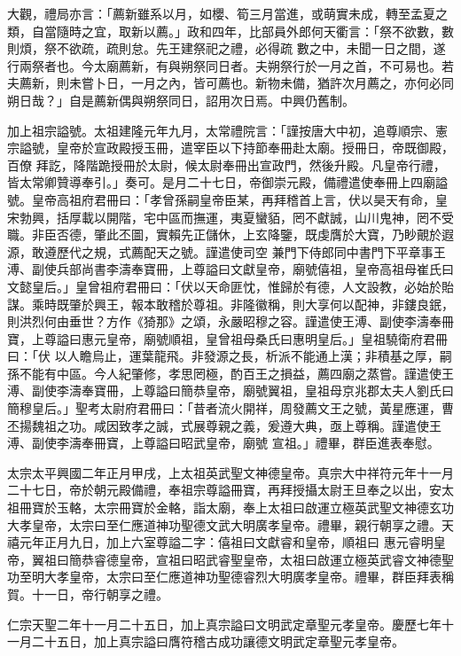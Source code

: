 \begin{pinyinscope}
 大觀，禮局亦言：「薦新雖系以月，如櫻、筍三月當進，或萌實未成，轉至孟夏之類，自當隨時之宜，取新以薦。」政和四年，比部員外郎何天衢言：「祭不欲數，數則煩，祭不欲疏，疏則怠。先王建祭祀之禮，必得疏
 數之中，未聞一日之間，遂行兩祭者也。今太廟薦新，有與朔祭同日者。夫朔祭行於一月之首，不可易也。若夫薦新，則未嘗卜日，一月之內，皆可薦也。新物未備，猶許次月薦之，亦何必同朔日哉？」自是薦新偶與朔祭同日，詔用次日焉。中興仍舊制。



 加上祖宗謚號。太祖建隆元年九月，太常禮院言：「謹按唐大中初，追尊順宗、憲宗謚號，皇帝於宣政殿授玉冊，遣宰臣以下持節奉冊赴太廟。授冊日，帝既御殿，百僚
 拜訖，降階跪授冊於太尉，候太尉奉冊出宣政門，然後升殿。凡皇帝行禮，皆太常卿贊導奉引。」奏可。是月二十七日，帝御崇元殿，備禮遣使奉冊上四廟謚號。皇帝高祖府君冊曰：「孝曾孫嗣皇帝臣某，再拜稽首上言，伏以昊天有命，皇宋勃興，括厚載以開階，宅中區而撫運，夷夏蠻貊，罔不獻誠，山川鬼神，罔不受職。非臣否德，肇此丕圖，實賴先正儲休，上玄降鑒，既虔膺於大寶，乃眇覿於遐源，敢遵歷代之規，式薦配天之號。謹遣使司空
 兼門下侍郎同中書門下平章事王溥、副使兵部尚書李濤奉寶冊，上尊謚曰文獻皇帝，廟號僖祖，皇帝高祖母崔氏曰文懿皇后。」皇曾祖府君冊曰：「伏以天命匪忱，惟歸於有德，人文設教，必始於貽謀。乘時既肇於興王，報本敢稽於尊祖。非隆徽稱，則大享何以配神，非鏤良鈱，則洪烈何由垂世？方作《猗那》之頌，永嚴昭穆之容。謹遣使王溥、副使李濤奉冊寶，上尊謚曰惠元皇帝，廟號順祖，皇曾祖母桑氏曰惠明皇后。」皇祖驍衛府君冊曰：「伏
 以人瞻烏止，運葉龍飛。非發源之長，析派不能通上漢；非積基之厚，嗣孫不能有中區。今人紀肇修，孝思罔極，酌百王之損益，薦四廟之蒸嘗。謹遣使王溥、副使李濤奉寶冊，上尊謚曰簡恭皇帝，廟號翼祖，皇祖母京兆郡太夫人劉氏曰簡穆皇后。」聖考太尉府君冊曰：「昔者流火開祥，周發薦文王之號，黃星應運，曹丕揚魏祖之功。咸因致孝之誠，式展尊親之義，爰遵大典，亟上尊稱。謹遣使王溥、副使李濤奉冊寶，上尊謚曰昭武皇帝，廟號
 宣祖。」禮畢，群臣進表奉慰。



 太宗太平興國二年正月甲戌，上太祖英武聖文神德皇帝。真宗大中祥符元年十一月二十七日，帝於朝元殿備禮，奉祖宗尊謚冊寶，再拜授攝太尉王旦奉之以出，安太祖冊寶於玉輅，太宗冊寶於金輅，詣太廟，奉上太祖曰啟運立極英武聖文神德玄功大孝皇帝，太宗曰至仁應道神功聖德文武大明廣孝皇帝。禮畢，親行朝享之禮。天禧元年正月九日，加上六室尊謚二字：僖祖曰文獻睿和皇帝，順祖曰
 惠元睿明皇帝，翼祖曰簡恭睿德皇帝，宣祖曰昭武睿聖皇帝，太祖曰啟運立極英武睿文神德聖功至明大孝皇帝，太宗曰至仁應道神功聖德睿烈大明廣孝皇帝。禮畢，群臣拜表稱賀。十一日，帝行朝享之禮。



 仁宗天聖二年十一月二十五日，加上真宗謚曰文明武定章聖元孝皇帝。慶歷七年十一月二十五日，加上真宗謚曰膺符稽古成功讓德文明武定章聖元孝皇帝。




\end{pinyinscope}
